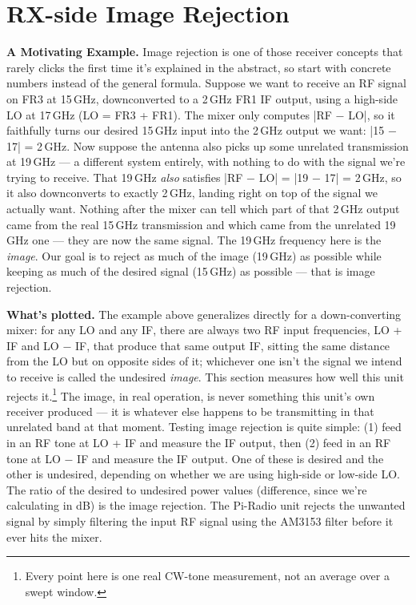 \clearpage
\section{RX-side Image Rejection}
\label{sec:rx-image-rejection}

\textbf{A Motivating Example.} Image rejection is one of those receiver concepts that rarely clicks the first
time it's explained in the abstract, so start with concrete numbers instead of the general formula. Suppose we
want to receive an RF signal on FR3 at 15\,GHz, downconverted to a 2\,GHz FR1 IF output, using a high-side LO at
17\,GHz (LO = FR3 + FR1). The mixer only computes |RF − LO|, so it faithfully
turns our desired 15\,GHz input into the 2\,GHz output we want: |15 − 17| = 2\,GHz. Now suppose the antenna also
picks up some unrelated transmission at 19\,GHz --- a different system entirely, with nothing to do with the
signal we're trying to receive. That 19\,GHz \emph{also} satisfies |RF − LO| = |19 − 17| = 2\,GHz,
so it also downconverts to exactly 2\,GHz, landing right on top of the signal we actually want. Nothing after
the mixer can tell which part of that 2\,GHz output came from the real 15\,GHz transmission and which came from
the unrelated 19\,GHz one --- they are now the same signal. The 19\,GHz frequency here is the \emph{image}. Our
goal is to reject as much of the image (19\,GHz) as possible while keeping as much of the desired signal
(15\,GHz) as possible --- that is image rejection.

\textbf{What's plotted.} The example above generalizes directly for a down-converting mixer: for any LO and any
IF, there are always two RF input frequencies, LO + IF and LO − IF, that produce
that same output IF, sitting the same distance from the LO but on opposite sides of it; whichever one isn't the
signal we intend to receive is called the undesired \emph{image}. This section measures how well this unit
rejects it.\footnote{Every point here is one real CW-tone measurement, not an average over a swept window.} The
image, in real operation, is never something this unit's own receiver produced --- it is whatever else happens
to be transmitting in that unrelated band at that moment. Testing image rejection is quite simple: (1) feed in
an RF tone at LO + IF and measure the IF output, then (2) feed in an RF tone at
LO − IF and measure the IF output. One of these is desired and the other is undesired, depending
on whether we are using high-side or low-side LO. The ratio of the desired to undesired power values
(difference, since we're calculating in dB) is the image rejection. The Pi-Radio unit rejects the unwanted
signal by simply filtering the input RF signal using the AM3153 filter before it ever hits the mixer.

